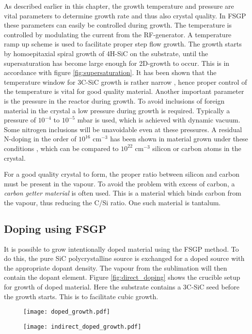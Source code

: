 As described earlier in this chapter, the growth temperature and pressure are vital parameters to determine growth rate and thus also crystal quality. In FSGP these parameters can easily be controlled during growth. The temperature is controlled by modulating the current from the RF-generator. A temperature ramp up scheme is used to facilitate proper step flow growth. The growth starts by homoepitaxial spiral growth of 4H-SiC on the substrate, until the supersaturation has become large enough for 2D-growth to occur. This is in accordance with figure \ref{fig:supersaturation}. It has been shown that the temperature window for 3C-SiC growth is rather narrow \cite{Vasiliauskas2012}, hence proper control of the temperature is vital for good quality material. Another important parameter is the pressure in the reactor during growth. To avoid inclusions of foreign material in the crystal a low pressure during growth is required. Typically a pressure of $10^{-4}$ to $10^{-5}$ mbar is used, which is achieved with dynamic vacuum. Some nitrogen inclusions will be unavoidable even at these pressures. A residual N-doping in the order of $10^{16}$ cm$^{-3}$ has been shown in material grown under these conditions \cite{Jokubavicius2014}, which can be compared to $10^{22}$ cm$^{-3}$ silicon or carbon atoms in the crystal. 

For a good quality crystal to form, the proper ratio between silicon and carbon must be present in the vapour. To avoid the problem with excess of carbon, a \emph{carbon getter material} is often used. This is a material which binds carbon from the vapour, thus reducing the C/Si ratio. One such material is tantalum. 

\subsection{Doping using FSGP}
It is possible to grow intentionally doped material using the FSGP method. To do this, the pure SiC polycrystalline source is exchanged for a doped source with the appropriate dopant density. The vapour from the sublimation will then contain the dopant element. Figure \ref{fig:direct_doping} shows the crucible setup for growth of doped material. Here the substrate contains a 3C-SiC seed before the growth starts. This is to facilitate cubic growth. 

\begin{figure}[h]
\centering
\begin{minipage}{.5\textwidth}
  \centering
  \texttt{[image: doped\_growth.pdf]}
  \label{fig:direct_doping}
\end{minipage}%
\begin{minipage}{.5\textwidth}
  \centering
  \texttt{[image: indirect\_doped\_growth.pdf]}
  \label{fig:indirect_doping}
\end{minipage}
\end{figure}

